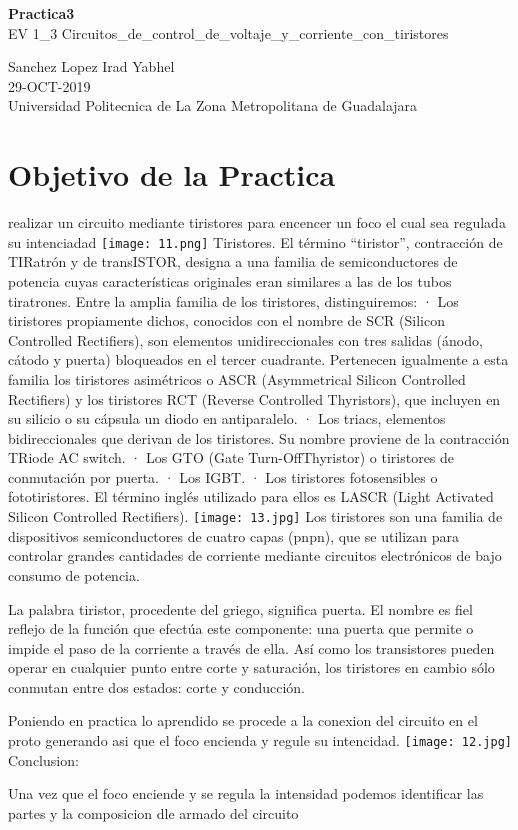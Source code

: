 \documentclass[11pt,a4paper]{article}
\begin{document}
\begin{center}
\textbf{Practica3}\\ 
EV 1_3 Circuitos_de_control_de_voltaje_y_corriente_con_tiristores
\end{center}

\begin{center}
Sanchez Lopez Irad Yabhel\\
29-OCT-2019\\
Universidad Politecnica de La Zona Metropolitana de Guadalajara
\end{center}


\section{Objetivo de la Practica}

realizar un circuito mediante tiristores para encencer un foco el cual sea regulada su intenciadad
\texttt{[image: 11.png]} 
Tiristores.
El término “tiristor”, contracción de TIRatrón y de transISTOR, designa a
una familia de semiconductores de potencia cuyas características originales eran similares a
las de los tubos tiratrones.
Entre la amplia familia de los tiristores, distinguiremos:
· Los tiristores propiamente dichos, conocidos con el nombre de SCR (Silicon Controlled Rectifiers), son elementos unidireccionales con tres salidas
(ánodo, cátodo y puerta) bloqueados en el tercer cuadrante. Pertenecen
igualmente a esta familia los tiristores asimétricos o ASCR (Asymmetrical
Silicon Controlled Rectifiers) y los tiristores RCT (Reverse Controlled
Thyristors), que incluyen en su silicio o su cápsula un diodo en antiparalelo.
· Los triacs, elementos bidireccionales que derivan de los tiristores. Su
nombre proviene de la contracción TRiode AC switch.
· Los GTO (Gate Turn-OffThyristor) o tiristores de conmutación por puerta.
· Los IGBT.
· Los tiristores fotosensibles o fototiristores. El término inglés utilizado para
ellos es LASCR (Light Activated Silicon Controlled Rectifiers).
\texttt{[image: 13.jpg]} 
Los tiristores son una familia de dispositivos semiconductores de cuatro capas (pnpn), que se utilizan para controlar grandes cantidades de corriente mediante circuitos electrónicos de bajo consumo de potencia.

La palabra tiristor, procedente del griego, significa puerta. El nombre es fiel reflejo de la función que efectúa este componente: una puerta que permite o impide el paso de la corriente a través de ella. Así como los transistores pueden operar en cualquier punto entre corte y saturación, los tiristores en cambio sólo conmutan entre dos estados: corte y conducción.

Poniendo en practica lo aprendido se procede a la conexion del circuito en el proto generando asi que el foco encienda y regule su intencidad.
\texttt{[image: 12.jpg]} 
Conclusion:

Una vez que el foco enciende y se regula la intensidad podemos identificar las partes y la composicion dle armado del circuito
\end{document}
